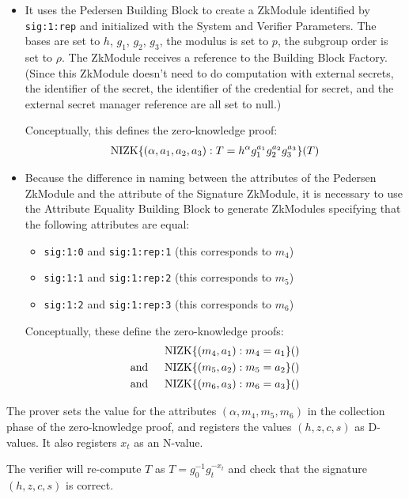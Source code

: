 \begin{itemize}
\begin{itemize}
\item It uses the Pedersen Building Block to create a ZkModule identified by \texttt{sig:1:rep} and initialized
with the System and Verifier Parameters.
The bases are set to $h$, $g_1$, $g_2$, $g_3$, the modulus is set to $p$, the subgroup order is set
to $\rho$.
The ZkModule receives a reference to the Building Block Factory.
(Since this ZkModule doesn't need to do computation with external secrets,
the identifier of the secret, the identifier of the credential for secret, and the external secret manager reference are all set to null.)

Conceptually, this defines the zero-knowledge proof:
\begin{align}
\operatorname{NIZK}\lbrace(\alpha, a_1, a_2, a_3): T = h^{\alpha} g_1^{a_1} g_2^{a_2} g_3^{a_3} \rbrace(T)
\end{align}

\item Because the difference in naming between the attributes of the Pedersen ZkModule and the attribute
of the Signature ZkModule, it is necessary to use the Attribute Equality Building Block to generate
ZkModules specifying that the following attributes are equal:
  \begin{itemize}
  \item \texttt{sig:1:0} and \texttt{sig:1:rep:1} (this corresponds to $m_4$)
  \item \texttt{sig:1:1} and \texttt{sig:1:rep:2} (this corresponds to $m_5$)
  \item \texttt{sig:1:2} and \texttt{sig:1:rep:3} (this corresponds to $m_6$)
  \end{itemize}
  Conceptually, these define the zero-knowledge proofs:
  \begin{align}
  \label{eq:ex:uprove:last}
  &\operatorname{NIZK}\lbrace(m_4, a_1): m_4 = a_1\rbrace() \\
  \mbox{and }\quad&\operatorname{NIZK}\lbrace(m_5, a_2): m_5 = a_2\rbrace() \\
  \mbox{and }\quad&\operatorname{NIZK}\lbrace(m_6, a_3): m_6 = a_3\rbrace()
  \end{align}
\end{itemize}

The prover sets the value for the attributes $(\alpha, m_4, m_5, m_6)$ in the collection phase of the
zero-knowledge proof, and registers the values $(h, z, c, s)$ as D-values. It also registers $x_t$
as an N-value.

The verifier will re-compute $T$ as
$T = g_0^{-1}g_t^{-x_t}$ and check that
the signature
$(h, z, c, s)$ is correct.


\end{itemize}
